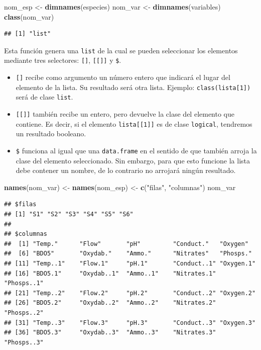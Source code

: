 \documentclass[
  spanish,
]{article}
\newenvironment{Shaded}{\begin{snugshade}}{\end{snugshade}}
\newcommand{\KeywordTok}[1]{\textcolor[rgb]{0.13,0.29,0.53}{\textbf{#1}}}
\newcommand{\NormalTok}[1]{#1}
\newcommand{\StringTok}[1]{\textcolor[rgb]{0.31,0.60,0.02}{#1}}
\providecommand{\tightlist}{%
  \setlength{\itemsep}{0pt}\setlength{\parskip}{0pt}}
\begin{document}
\begin{Shaded}
\begin{Highlighting}[]
\NormalTok{nom\_esp \textless{}{-}}\StringTok{ }\KeywordTok{dimnames}\NormalTok{(especies)}
\NormalTok{nom\_var \textless{}{-}}\StringTok{ }\KeywordTok{dimnames}\NormalTok{(variables)}
\KeywordTok{class}\NormalTok{(nom\_var)}
\end{Highlighting}
\end{Shaded}

\begin{verbatim}
## [1] "list"
\end{verbatim}

Esta función genera una \texttt{list} de la cual se pueden seleccionar los elementos mediante tres selectores: \texttt{{[}{]}}, \texttt{{[}{[}{]}{]}} y \texttt{\$}.

\begin{itemize}
\tightlist
\item
  \texttt{{[}{]}} recibe como argumento un número entero que indicará el lugar del elemento de la lista. Su resultado será otra lista. Ejemplo: \texttt{class(lista{[}1{]})} será de clase \texttt{list}.
\item
  \texttt{{[}{[}{]}{]}} también recibe un entero, pero devuelve la clase del elemento que contiene. Es decir, si el elemento \texttt{lista{[}{[}1{]}{]}} es de clase \texttt{logical}, tendremos un resultado booleano.
\item
  \texttt{\$} funciona al igual que una \texttt{data.frame} en el sentido de que también arroja la clase del elemento seleccionado. Sin embargo, para que esto funcione la lista debe contener un nombre, de lo contrario no arrojará ningún resultado.
\end{itemize}

\begin{Shaded}
\begin{Highlighting}[]
\KeywordTok{names}\NormalTok{(nom\_var) \textless{}{-}}\StringTok{ }\KeywordTok{names}\NormalTok{(nom\_esp) \textless{}{-}}\StringTok{ }\KeywordTok{c}\NormalTok{(}\StringTok{"filas"}\NormalTok{, }\StringTok{"columnas"}\NormalTok{)}
\NormalTok{nom\_var}
\end{Highlighting}
\end{Shaded}

\begin{verbatim}
## $filas
## [1] "S1" "S2" "S3" "S4" "S5" "S6"
## 
## $columnas
##  [1] "Temp."      "Flow"       "pH"         "Conduct."   "Oxygen"    
##  [6] "BDO5"       "Oxydab."    "Ammo."      "Nitrates"   "Phosps."   
## [11] "Temp..1"    "Flow.1"     "pH.1"       "Conduct..1" "Oxygen.1"  
## [16] "BDO5.1"     "Oxydab..1"  "Ammo..1"    "Nitrates.1" "Phosps..1" 
## [21] "Temp..2"    "Flow.2"     "pH.2"       "Conduct..2" "Oxygen.2"  
## [26] "BDO5.2"     "Oxydab..2"  "Ammo..2"    "Nitrates.2" "Phosps..2" 
## [31] "Temp..3"    "Flow.3"     "pH.3"       "Conduct..3" "Oxygen.3"  
## [36] "BDO5.3"     "Oxydab..3"  "Ammo..3"    "Nitrates.3" "Phosps..3"
\end{verbatim}
\end{document}
